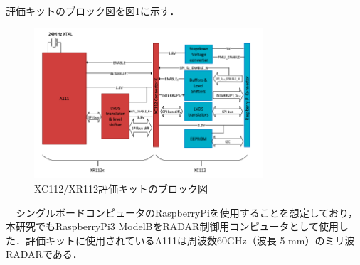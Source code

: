 評価キットのブロック図を図\ref{fig:EVK_Block}に示す．
\begin{figure}[H]
    \centering
    \includegraphics[width=8.5cm]{./fig/EVK_Block.png}
    \caption{XC112/XR112評価キットのブロック図\cite{XC112_XR112UserGuide}}
    \label{fig:EVK_Block}
\end{figure}

　シングルボードコンピュータのRaspberryPiを使用することを想定しており，本研究でもRaspberryPi3 ModelBをRADAR制御用コンピュータとして使用した．評価キットに使用されているA111は周波数60GHz（波長 5 mm）のミリ波RADARである\cite{XC112_XR112UserGuide}．
